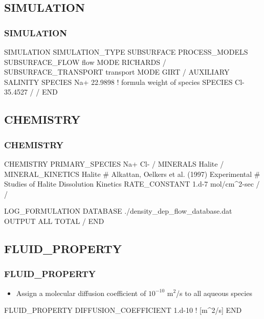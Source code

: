 \documentclass{beamer}
\newcommand\bluecomment[1]{{{\color{blue} #1}}}
\newcommand\magentacomment[1]{{{\color{magenta} #1}}}
\begin{document}
\subsection{SIMULATION}
\begin{frame}\frametitle{SIMULATION}

\begin{semiverbatim}
SIMULATION
  SIMULATION_TYPE SUBSURFACE
  PROCESS_MODELS
    SUBSURFACE_FLOW flow
      MODE RICHARDS
    /
    SUBSURFACE_TRANSPORT transport
      MODE GIRT
    /
    \magentacomment{AUXILIARY SALINITY
      SPECIES Na+ 22.9898    \bluecomment{! formula weight of species}
      SPECIES Cl- 35.4527
    /}
  /
END
\end{semiverbatim}

\end{frame}

\subsection{CHEMISTRY}

\begin{frame}\frametitle{CHEMISTRY}
\begin{semiverbatim}
CHEMISTRY
  PRIMARY_SPECIES
    Na+
    Cl-
  /
  MINERALS
    Halite
  /
  MINERAL_KINETICS
    Halite
      \bluecomment{# Alkattan, Oelkers et al. (1997) Experimental
      #  Studies of Halite Dissolution Kinetics}
      RATE_CONSTANT 1.d-7 mol/cm^2-sec 
    /
  /
  
  LOG_FORMULATION
  DATABASE ./density_dep_flow_database.dat
  OUTPUT
    ALL
    TOTAL
  /
END
\end{semiverbatim}

\end{frame}

\subsection{FLUID\_PROPERTY}

\begin{frame}\frametitle{FLUID\_PROPERTY}

\begin{itemize}
  \item Assign a molecular diffusion coefficient of $10^{-10}$ m$^2$/s to all aqueous species
\end{itemize}

\begin{semiverbatim}
  
FLUID_PROPERTY
  DIFFUSION_COEFFICIENT 1.d-10   \bluecomment{! [m^2/s]}
END
\end{semiverbatim}

\end{frame}
\end{document}
